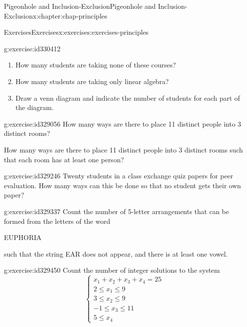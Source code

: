 \documentclass[oneside,10pt,]{book}
\numberwithin{equation}{section}
\newcommand{\amp}{&}
\begin{document}
\begin{chapterptx}{Pigeonhole and Inclusion-Exclusion}{}{Pigeonhole and Inclusion-Exclusion}{}{}{x:chapter:chap-principles}
\begin{exercises-section}{Exercises}{}{Exercises}{}{}{x:exercises:exercises-principles}
\begin{divisionexercise}{9}{}{}{g:exercise:id330412}
%
\begin{enumerate}[label=(\alph*)]
\item{}How many students are taking none of these courses?%
\item{}How many students are taking only linear algebra?%
\item{}Draw a venn diagram and indicate the number of students for each part of the diagram.%
\end{enumerate}
%
\end{divisionexercise}%
\begin{divisionexercise}{10}{}{}{g:exercise:id329056}%
How many ways are there to place 11 distinct people into 3 distinct rooms?%
\par
How many ways are there to place 11 distinct people into 3 distinct rooms such that each room has at least one person?%
\end{divisionexercise}%
\begin{divisionexercise}{11}{}{}{g:exercise:id329246}%
Twenty students in a class exchange quiz papers for peer evaluation. How many ways can this be done so that no student gets their own paper?%
\end{divisionexercise}%
\begin{divisionexercise}{12}{}{}{g:exercise:id329337}%
Count the number of 5-letter arrangements that can be formed from the letters of the word%
\begin{sidebyside}{1}{0.375}{0.375}{0}%
\begin{sbspanel}{0.25}%
EUPHORIA%
\end{sbspanel}%
\end{sidebyside}%
\par
such that the string EAR does not appear, and there is at least one vowel.%
\end{divisionexercise}%
\begin{divisionexercise}{13}{}{}{g:exercise:id329450}%
Count the number of integer solutions to the system%
\begin{equation*}
\begin{cases} x_1 + x_2 + x_3 + x_4 = 25 \amp \\ 
2 \leq x_1 \leq 9 \amp \\
3 \leq x_2 \leq 9 \amp \\
-1 \leq x_3 \leq 11 \amp \\
5 \leq x_4 \ \ \amp \end{cases}
\end{equation*}
%
\end{divisionexercise}%

\end{exercises-section}
\end{chapterptx}
\end{document}
